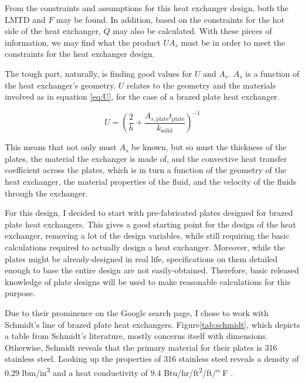 \documentclass[12pt,letterpaper]{article}
\begin{document}
From the constraints and assumptions for this heat exchanger design, both the LMTD and \(F\) may be found.  In addition, based on the constraints for the hot side of the heat exchanger, \(\dot{Q}\) may also be calculated. With these pieces of information, we may find what the product \(UA_s\) must be in order to meet the constraints for the heat exchanger design. 

The tough part, naturally, is finding good values for \(U\) and \(A_s\). \(A_s\) is a function of the heat exchanger's geometry.  \(U\) relates to the geometry and the materials involved as in equation \ref{eq:U}, for the case of a brazed plate heat exchanger.

\begin{equation}
\label{eq:U}
U = \left(\frac{2}{h} + \frac{A_{s, \textrm{plate}} t_{\textrm{plate}}}{k_{\textrm{solid}}} \right)^{-1}
\end{equation}

This means that not only must \(A_s\) be known, but so must the thickness of the plates, the material the exchanger is made of, and the convective heat transfer coefficient across the plates, which is in turn a function of the geometry of the heat exchanger, the material properties of the fluid, and the velocity of the fluids through the exchanger.

For this design, I decided to start with pre-fabricated plates designed for brazed plate heat exchangers. This gives a good starting point for the design of the heat exchanger, removing a lot of the design variables, while still requiring the basic calculations required to actually design a heat exchanger. Moreover, while the plates might be already-designed in real life, specifications on them detailed enough to base the entire design are not easily-obtained. Therefore, basic released knowledge of plate designs will be used to make reasonable calculations for this purpose.

Due to their prominence on the Google search page, I chose to work with Schmidt's line of brazed plate heat exchangers. Figure\ref{tab:schmidt}, which depicts a table from Schmidt's literature, mostly concerns itself with dimensions. Otherwise, Schmidt reveals that the primary material for their plates is 316 stainless steel. Looking up the properties of 316 stainless steel reveals a density of \(0.29\) lbm/in\textsuperscript{3} and a heat conductivity of \(9.4\) Btu/hr/ft\textsuperscript{2}/ft/\textsuperscript{o} F .
\end{document}
